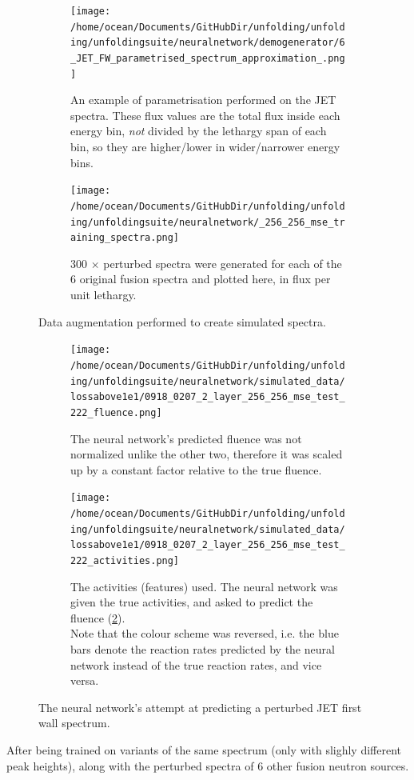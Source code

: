 \documentclass[a4paper, 12pt]{article}
\begin{document}
\begin{figure}
\centering
    \begin{subfigure}[b]{.3\linewidth}
        \texttt{[image: /home/ocean/Documents/GitHubDir/unfolding/unfolding/unfoldingsuite/neuralnetwork/demogenerator/6\_JET\_FW\_parametrised\_spectrum\_approximation\_.png]}
        \caption{An example of parametrisation performed on the JET spectra. These flux values are the total flux inside each energy bin, \emph{not} divided by the lethargy span of each bin, so they are higher/lower in wider/narrower energy bins.}
    \end{subfigure}
    \hfill
    \begin{subfigure}[b]{.65\linewidth}
        \texttt{[image: /home/ocean/Documents/GitHubDir/unfolding/unfolding/unfoldingsuite/neuralnetwork/\_256\_256\_mse\_training\_spectra.png]}
        \caption{300 $\times$ perturbed spectra were generated for each of the 6 original fusion spectra and plotted here, in flux per unit lethargy.}
    \end{subfigure}
\caption{Data augmentation performed to create simulated spectra.}\label{Parametrisation}
\end{figure}

\begin{figure}
\centering
    \begin{subfigure}[b]{11cm}
    \texttt{[image: /home/ocean/Documents/GitHubDir/unfolding/unfolding/unfoldingsuite/neuralnetwork/simulated\_data/lossabove1e1/0918\_0207\_2\_layer\_256\_256\_mse\_test\_222\_fluence.png]}
    \caption{The neural network's predicted fluence was not normalized unlike the other two, therefore it was scaled up by a constant factor relative to the true fluence.}\label{SimulatedFluence}
    \end{subfigure}
    \begin{subfigure}[b]{5cm}
    \texttt{[image: /home/ocean/Documents/GitHubDir/unfolding/unfolding/unfoldingsuite/neuralnetwork/simulated\_data/lossabove1e1/0918\_0207\_2\_layer\_256\_256\_mse\_test\_222\_activities.png]}
    \caption{The activities (features) used. The neural network was given the true activities, and asked to predict the fluence (\ref{SimulatedFluence}).
    \\Note that the colour scheme was reversed, i.e. the blue bars denote the reaction rates predicted by the neural network instead of the true reaction rates, and vice versa.
    }
    \end{subfigure}
\caption{The neural network's attempt at predicting a perturbed JET first wall spectrum.} \label{SimulatedExample}
\end{figure}
After being trained on variants of the same spectrum (only with slighly different peak heights), along with the perturbed spectra of 6 other fusion neutron sources.
\end{document}
